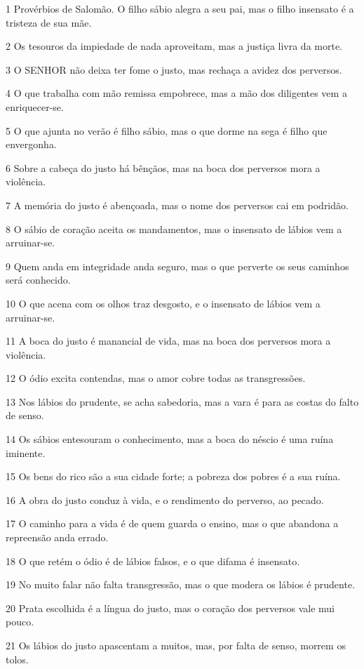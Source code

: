 \par 1 Provérbios de Salomão. O filho sábio alegra a seu pai, mas o filho insensato é a tristeza de sua mãe.
\par 2 Os tesouros da impiedade de nada aproveitam, mas a justiça livra da morte.
\par 3 O SENHOR não deixa ter fome o justo, mas rechaça a avidez dos perversos.
\par 4 O que trabalha com mão remissa empobrece, mas a mão dos diligentes vem a enriquecer-se.
\par 5 O que ajunta no verão é filho sábio, mas o que dorme na sega é filho que envergonha.
\par 6 Sobre a cabeça do justo há bênçãos, mas na boca dos perversos mora a violência.
\par 7 A memória do justo é abençoada, mas o nome dos perversos cai em podridão.
\par 8 O sábio de coração aceita os mandamentos, mas o insensato de lábios vem a arruinar-se.
\par 9 Quem anda em integridade anda seguro, mas o que perverte os seus caminhos será conhecido.
\par 10 O que acena com os olhos traz desgosto, e o insensato de lábios vem a arruinar-se.
\par 11 A boca do justo é manancial de vida, mas na boca dos perversos mora a violência.
\par 12 O ódio excita contendas, mas o amor cobre todas as transgressões.
\par 13 Nos lábios do prudente, se acha sabedoria, mas a vara é para as costas do falto de senso.
\par 14 Os sábios entesouram o conhecimento, mas a boca do néscio é uma ruína iminente.
\par 15 Os bens do rico são a sua cidade forte; a pobreza dos pobres é a sua ruína.
\par 16 A obra do justo conduz à vida, e o rendimento do perverso, ao pecado.
\par 17 O caminho para a vida é de quem guarda o ensino, mas o que abandona a repreensão anda errado.
\par 18 O que retém o ódio é de lábios falsos, e o que difama é insensato.
\par 19 No muito falar não falta transgressão, mas o que modera os lábios é prudente.
\par 20 Prata escolhida é a língua do justo, mas o coração dos perversos vale mui pouco.
\par 21 Os lábios do justo apascentam a muitos, mas, por falta de senso, morrem os tolos.
